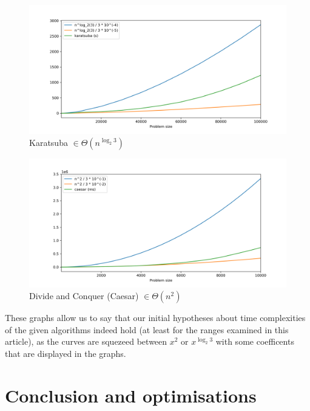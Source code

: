 \documentclass[12pt, oneside]{article}
\begin{document}
\begin{figure}[h]
\caption{Karatsuba $\in \Theta (n^{\log_2 3})$}

\includegraphics[width=1\textwidth]{O_karatsuba}
\end{figure}
\clearpage
\begin{figure}[t]
\caption{Divide and Conquer (Caesar) $\in \Theta(n^2)$}

\includegraphics[width=1\textwidth]{O_caesar}
\end{figure}

These graphs allow us to say that our initial hypotheses about time complexities of the given algorithms indeed hold (at least for the ranges examined in this article), as the curves are squezeed between $x^2$  or  $x^{\log_2 3}$ with some coefficents that are displayed in the graphs.

\section{Conclusion and optimisations}
\end{document}
